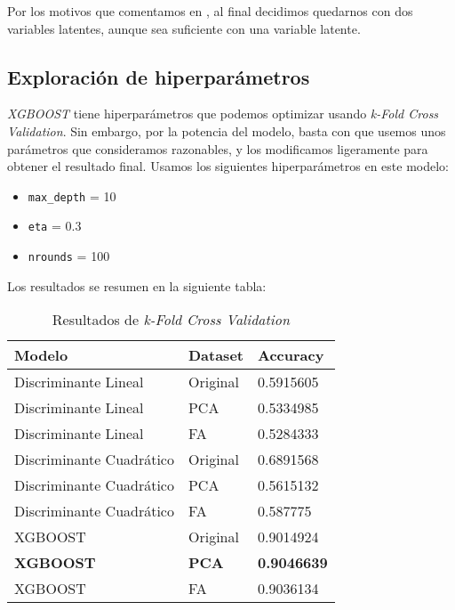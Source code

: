 Por los motivos que comentamos en , al final decidimos quedarnos con dos variables latentes, aunque sea suficiente con una variable latente.

\subsection{Exploración de hiperparámetros}

\textit{XGBOOST} tiene hiperparámetros que podemos optimizar usando \textit{k-Fold Cross Validation}. Sin embargo, por la potencia del modelo, basta con que usemos unos parámetros que consideramos razonables, y los modificamos ligeramente para obtener el resultado final. Usamos los siguientes hiperparámetros en este modelo:

\begin{itemize}
    \item \lstinline{max_depth} = 10
    \item \lstinline{eta} = 0.3
    \item \lstinline{nrounds} = 100
\end{itemize}

Los resultados se resumen en la siguiente tabla:

\begin{table}[H]
\centering
\begin{tabular}{|l|l|l|}
    \hline
    Modelo                   & Dataset      & Accuracy      \\
    \hline
    Discriminante Lineal     & Original     & 0.5915605     \\
    Discriminante Lineal     & PCA          & 0.5334985     \\
    Discriminante Lineal     & FA           & 0.5284333     \\
    Discriminante Cuadrático & Original     & 0.6891568     \\
    Discriminante Cuadrático & PCA          & 0.5615132     \\
    Discriminante Cuadrático & FA           & 0.587775      \\
    XGBOOST                  & Original     & 0.9014924     \\
    \textbf{XGBOOST}         & \textbf{PCA} & \textbf{0.9046639} \\
    XGBOOST                  & FA           & 0.9036134     \\
    \hline

\end{tabular}
\caption{Resultados de \textit{k-Fold Cross Validation}}
\label{table:cross_validation}
\end{table}

